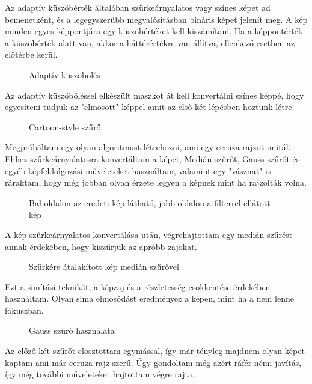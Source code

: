 Az adaptív küszöbérték általában szürkeárnyalatos vagy színes képet ad bemenetként, és a legegyszerűbb megvalósításban bináris képet jelenít meg. A kép minden egyes képpontjára egy küszöbértéket kell kiszámítani. Ha a képpontérték a küszöbérték alatt van, akkor a háttérértékre van állítva, ellenkező esetben az előtérbe kerül.
\begin{figure}[ht]
\centering
{}
\caption{Adaptív küszöbölés  } 
\label{fig: cartoon4}
\end{figure}
Az adaptív küszöböléssel elkészült maszkot át kell konvertálni színes képpé, hogy egyesíteni tudjuk az "elmosott" képpel amit az első két lépésben hoztunk létre.
\begin{figure}[ht]
\centering
{}
\caption{Cartoon-style szűrő } 
\label{fig: cartoon5}
\end{figure}
Megpróbáltam egy olyan algoritmust létrehozni, ami egy ceruza rajzot imitál. Ehhez szűrkeárnyalatosra konvertáltam a képet, Medián szűrőt, Gauss szűrőt és egyéb képfeldolgozási műveleteket használtam, valamint egy "vásznat" is ráraktam, hogy még jobban olyan érzete legyen a képnek mint ha rajzolták volna.
\begin{figure}[ht]
\centering
{}
\caption{Bal oldalon az eredeti kép látható, jobb oldalon a filterrel ellátott kép } 
\label{fig: pencil1}
\end{figure}
A kép szűrkeárnyalatos konvertálása után, végrehajtottam egy medián szűrést annak érdekében, hogy kiszűrjük az apróbb zajokat.
\begin{figure}[ht]
\centering
{}
\caption{Szürkére átalakított kép medián szűrővel  } 
\label{fig: pencil2}
\end{figure}
Ezt a simítási teknikát, a képzaj  és a részletesség csökkentése érdekében használtam. Olyan sima elmosódást eredményez a képen, mint ha a nem lenne fókuszban.
\begin{figure}[ht]
\centering
{}
\caption{Gauss szűrő használata } 
\label{fig: pencil3}
\end{figure}
Az előző két szűrőt elosztottam egymással, így már tényleg majdnem olyan képet kaptam ami már ceruza rajz szerű. Úgy gondoltam még azért ráfér némi javítás, így még további műveleteket hajtottam végre rajta.
